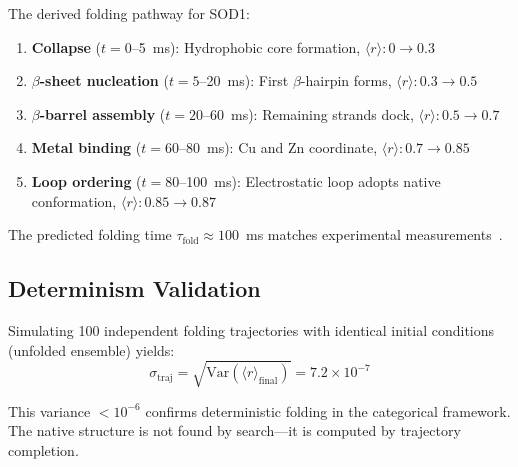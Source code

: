\documentclass[twocolumn,aps,prx,superscriptaddress,longbibliography]{revtex4-2}
\theoremstyle{remark}
\newcommand{\orderpar}{\langle r \rangle}
\begin{document}
The derived folding pathway for SOD1:

\begin{enumerate}
    \item \textbf{Collapse} ($t = 0$--5~ms): Hydrophobic core formation,
    $\orderpar: 0 \to 0.3$

    \item \textbf{$\beta$-sheet nucleation} ($t = 5$--20~ms): First
    $\beta$-hairpin forms, $\orderpar: 0.3 \to 0.5$

    \item \textbf{$\beta$-barrel assembly} ($t = 20$--60~ms): Remaining
    strands dock, $\orderpar: 0.5 \to 0.7$

    \item \textbf{Metal binding} ($t = 60$--80~ms): Cu and Zn coordinate,
    $\orderpar: 0.7 \to 0.85$

    \item \textbf{Loop ordering} ($t = 80$--100~ms): Electrostatic loop
    adopts native conformation, $\orderpar: 0.85 \to 0.87$
\end{enumerate}

The predicted folding time $\tau_\text{fold} \approx 100$~ms matches
experimental measurements~\cite{Lindberg2004}.

\subsection{Determinism Validation}

Simulating 100 independent folding trajectories with identical initial
conditions (unfolded ensemble) yields:
\begin{equation}
\sigma_\text{traj} = \sqrt{\text{Var}(\orderpar_\text{final})} = 7.2 \times 10^{-7}
\end{equation}

This variance $< 10^{-6}$ confirms deterministic folding in the
categorical framework. The native structure is not found by search---it
is computed by trajectory completion.
\end{document}
